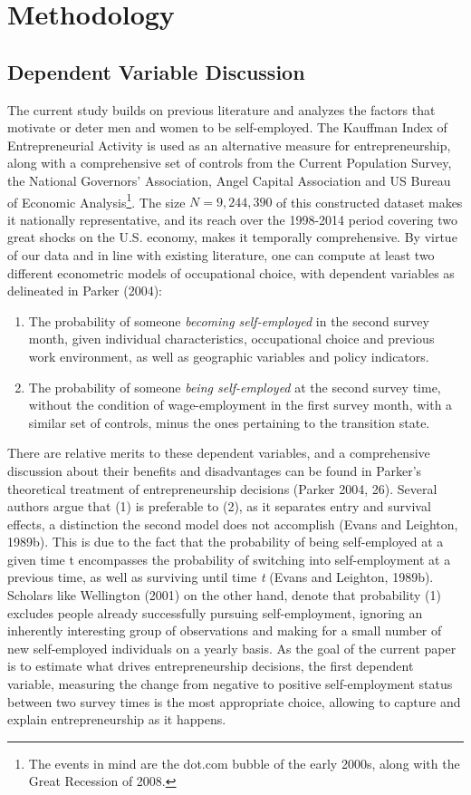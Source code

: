 \chapter{Methodology\label{ch:methods}}

\section{Dependent Variable Discussion}

The current study builds on previous literature and analyzes the factors that motivate or deter men and women to be self-employed. The Kauffman Index of Entrepreneurial Activity is used as an alternative measure for entrepreneurship, along with a comprehensive set of controls from the Current Population Survey, the National Governors' Association,  Angel Capital Association and US Bureau of Economic Analysis\footnote{The events in mind are the dot.com bubble of the early 2000s, along with the Great Recession of 2008.}. The size $N = 9,244,390$ of this constructed dataset makes it nationally representative, and its reach over the 1998-2014 period covering two great shocks on the U.S. economy, makes it temporally comprehensive. By virtue of our data and in line with existing literature, one can compute at least two different econometric models of occupational choice, with dependent variables as delineated in Parker (2004): 
\begin{enumerate}
\item The probability of someone \textit{becoming self-employed} in the second survey month, given individual characteristics, occupational choice and previous work environment, as well as geographic variables and policy indicators.
\item The probability of someone \textit{being self-employed} at the second survey time, without the condition of wage-employment in the first survey month, with a similar set of controls, minus the ones pertaining to the transition state. 
\end{enumerate}
There are relative merits to these dependent variables, and a comprehensive discussion about their benefits and disadvantages can be found in Parker's theoretical treatment of entrepreneurship decisions (Parker 2004, 26). Several authors argue that (1) is preferable to (2), as it separates entry and survival effects, a distinction the second model does not accomplish (Evans and Leighton, 1989b). This is due to the fact that the probability of being self-employed at a given time t encompasses the probability of switching into self-employment at a previous time, as well as surviving until time \textit{t} (Evans and Leighton, 1989b). Scholars like Wellington (2001) on the other hand, denote that probability (1) excludes people already successfully pursuing self-employment, ignoring an inherently interesting group of observations and making for a small number of new self-employed individuals on a yearly basis. As the goal of the current paper is to estimate what drives entrepreneurship decisions, the first dependent variable, measuring the change from negative to positive self-employment status between two survey times is the most appropriate choice, allowing to capture and explain entrepreneurship as it happens. 


